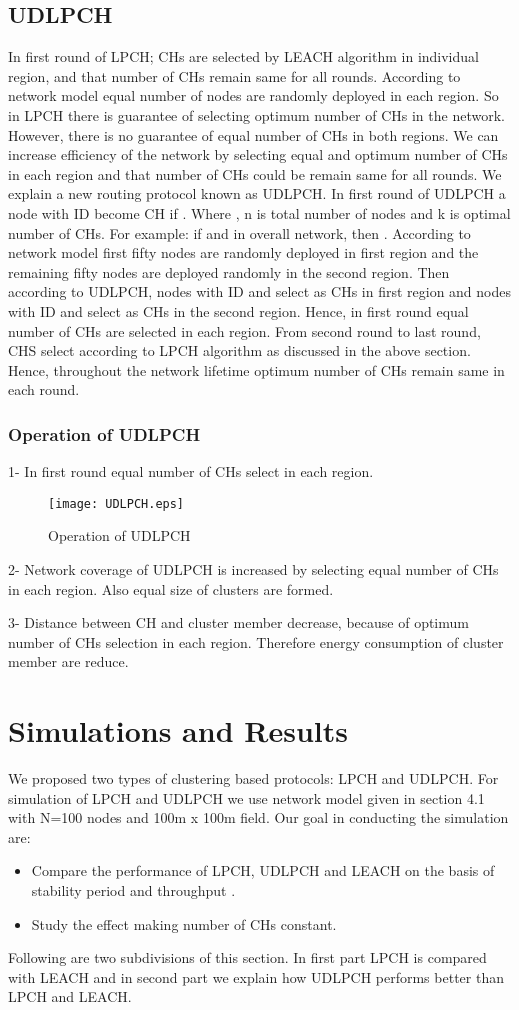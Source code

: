 \documentclass[journal]{IEEEtran}
\begin{document}
\subsection{UDLPCH}
In first round of LPCH; CHs are selected by LEACH algorithm in individual region, and that number of CHs remain same for all rounds. According to network model equal number of nodes are randomly deployed in each region. So in LPCH there is guarantee of selecting optimum number of CHs in the network. However, there is no guarantee of equal number of CHs in both regions. We can increase efficiency of the network by selecting equal and optimum number of CHs in each region and that number of CHs could be remain same for all rounds. We explain a new routing protocol known as UDLPCH. In first round of UDLPCH a node with ID  become CH if . Where , n is total number of nodes and k is optimal number of CHs.
For example: if  and  in overall network, then . According to network model first fifty nodes are randomly deployed in first region and the remaining fifty nodes are deployed randomly in the second region. Then according to UDLPCH, nodes with ID  and  select as CHs in first region and nodes with ID  and  select as CHs in the second region. Hence, in first round equal number of CHs are selected in each region. From second round to last round, CHS select according to LPCH algorithm as discussed in the above section. Hence, throughout the network lifetime optimum number of CHs remain same in each round. 
\subsubsection{Operation of UDLPCH }
{1}- In first round equal number of CHs select in each region.
\begin{figure*}[t]
\centering
\texttt{[image: UDLPCH.eps]}
\caption{Operation of UDLPCH}
\end{figure*}

{2}- Network coverage of UDLPCH is increased by selecting equal number of CHs in each region. Also equal size of clusters are formed.

{3}- Distance between CH and cluster member decrease, because of optimum number of CHs selection in each region. Therefore energy consumption of cluster member are reduce.

\section{Simulations and Results}
We proposed two types of clustering based protocols: LPCH and UDLPCH. For simulation of LPCH and UDLPCH we use network model given in section 4.1 with N=100 nodes and 100m x 100m field. Our goal in conducting the simulation are:
\begin{itemize}
\item
Compare the performance of LPCH, UDLPCH and LEACH on the basis of stability period and throughput .
\item
Study the effect making number of CHs constant.
\end{itemize}
Following are two subdivisions of this section. In first part LPCH is compared with LEACH and in second part we explain how UDLPCH performs better than LPCH and LEACH.
\end{document}
